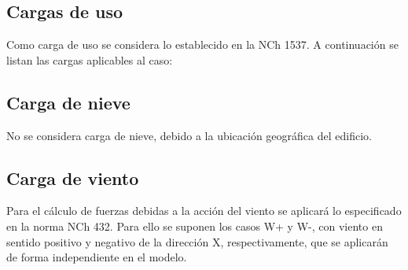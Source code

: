 \subsection{Cargas de uso}

Como carga de uso se considera lo establecido en la NCh 1537. A continuación se listan las cargas aplicables al caso:

\begin{table}[H]
  \centering
  \caption{Cargas de uso aplicables al edificio}
  \label{carga-uso}%
\end{table}%

\subsection{Carga de nieve}

No se considera carga de nieve, debido a la ubicación geográfica del edificio.

\subsection{Carga de viento}

Para el cálculo de fuerzas debidas a la acción del viento se aplicará lo especificado en la norma NCh 432.
Para ello se suponen los casos W+ y W-, con viento en sentido positivo y negativo de la dirección X, respectivamente, que se aplicarán de forma independiente en el modelo. 


